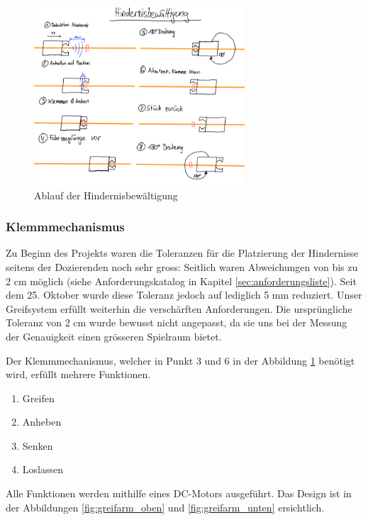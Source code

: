 \documentclass[../main.tex]{subfiles}
\begin{document}
\begin{figure}[H]
\centering
\includegraphics[width=0.7\textwidth]{img/lösungskonzpet/Skizzen/Skizze_Hindernisbewältigung.png}
\caption{Ablauf der Hindernisbewältigung}
\label{img:Skizze_Hindernisbewältigung}
\end{figure}


\subsubsection{Klemmmechanismus}

Zu Beginn des Projekts waren die Toleranzen für die Platzierung der Hindernisse seitens der Dozierenden noch sehr gross: Seitlich waren Abweichungen von bis zu 2 cm möglich (siehe Anforderungskatalog in Kapitel \ref{sec:anforderungsliste}). Seit dem 25. Oktober wurde diese Toleranz jedoch auf lediglich 5 mm reduziert. Unser Greifsystem erfüllt weiterhin die verschärften Anforderungen. Die ursprüngliche Toleranz von 2 cm wurde bewusst nicht angepasst, da sie uns bei der Messung der Genauigkeit einen grösseren Spielraum bietet.

Der Klemmmechanismus, welcher in Punkt 3 und 6 in der Abbildung \ref{img:Skizze_Hindernisbewältigung} benötigt wird, erfüllt mehrere Funktionen.

\begin{enumerate}
    \item Greifen
    \item Anheben
    \item Senken
    \item Loslassen
\end{enumerate}

Alle Funktionen werden mithilfe eines DC-Motors ausgeführt. Das Design ist in der Abbildungen \ref{fig:greifarm_oben} und \ref{fig:greifarm_unten} ersichtlich.
\newline
\end{document}
